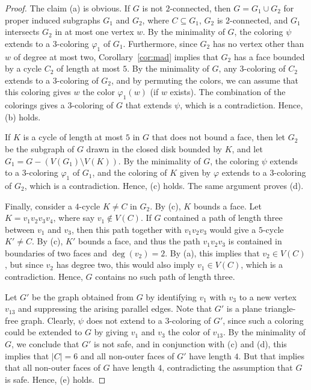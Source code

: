 \documentclass[12pt,twoside,openright,a4paper]{book}
\begin{document}
\begin{proof}
The claim (a) is obvious.  If $G$ is not $2$-connected, then $G=G_1\cup G_2$ for proper induced subgraphs $G_1$
and $G_2$, where $C\subseteq G_1$, $G_2$ is $2$-connected, and $G_1$ intersects $G_2$ in at most one vertex $w$.
By the minimality of $G$, the coloring $\psi$ extends to a $3$-coloring $\varphi_1$ of $G_1$.  Furthermore, since $G_2$ has
no vertex other than $w$ of degree at most two, Corollary~\ref{cor:mad} implies that $G_2$ has
a face bounded by a cycle $C_2$ of length at most $5$.  By the minimality of $G$, any $3$-coloring of $C_2$ extends
to a $3$-coloring of $G_2$, and by permuting the colors, we can assume that this coloring gives $w$ the color $\varphi_1(w)$
(if $w$ exists).  The combination of the colorings gives a $3$-coloring of $G$ that extends $\psi$, which is a contradiction.
Hence, (b) holds.

If $K$ is a cycle of length at most $5$ in $G$ that does not bound a face, then
let $G_2$ be the subgraph of $G$ drawn in the closed disk bounded by $K$,
and let $G_1=G-(V(G_1)\setminus V(K))$.  By the minimality of $G$, the coloring $\psi$ extends to a $3$-coloring $\varphi_1$ of $G_1$,
and the coloring of $K$ given by $\varphi$ extends to a $3$-coloring of $G_2$, which is a contradiction.  Hence, (c) holds.
The same argument proves (d). 

Finally, consider a $4$-cycle $K\neq C$ in $G_2$.  By (c), $K$ bounds a face.  Let $K=v_1v_2v_3v_4$, where say $v_1\not\in V(C)$.
If $G$ contained a path of length three between $v_1$ and $v_3$, then this path together with $v_1v_2v_3$ would give a $5$-cycle $K'\neq C$.
By (c), $K'$ bounds a face, and thus the path $v_1v_2v_3$ is contained in boundaries of two faces and $\deg(v_2)=2$.
By (a), this implies that $v_2\in V(C)$, but since $v_2$ has degree two, this would also imply $v_1\in V(C)$, which is a contradiction.
Hence, $G$ contains no such path of length three.

Let $G'$ be the graph obtained from $G$ by identifying $v_1$ with $v_3$ to a new vertex $v_{13}$ and suppressing
the arising parallel edges.  Note that $G'$ is a plane
triangle-free graph.  Clearly, $\psi$ does not extend to a $3$-coloring of $G'$,
since such a coloring could be extended to $G$ by giving $v_1$ and $v_3$ the color of $v_{13}$.  By the minimality of $G$,
we conclude that $G'$ is not safe, and in conjunction with (c) and (d), this implies that $|C|=6$ and
all non-outer faces of $G'$ have length $4$.  But that implies that all non-outer faces of $G$ have length $4$, contradicting
the assumption that $G$ is safe.  Hence, (e) holds.
\end{proof}
\end{document}

